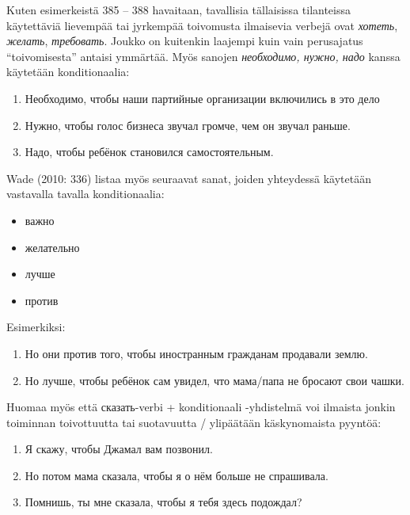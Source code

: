 \documentclass[]{scrreprt}
\providecommand{\tightlist}{%
  \setlength{\itemsep}{0pt}\setlength{\parskip}{0pt}}
\begin{document}
Kuten esimerkeistä 385 -- 388 havaitaan, tavallisia tällaisissa
tilanteissa käytettäviä lievempää tai jyrkempää toivomusta ilmaisevia
verbejä ovat \emph{хотеть}, \emph{желать}, \emph{требовать}. Joukko on
kuitenkin laajempi kuin vain perusajatus ``toivomisesta'' antaisi
ymmärtää. Myös sanojen \emph{необходимо, нужно, надо} kanssa käytetään
konditionaalia:

\begin{enumerate}
\def\labelenumi{(\arabic{enumi})}
\setcounter{enumi}{388}
\tightlist
\item
  Необходимо, чтобы наши партийные организации включились в это дело
\item
  Нужно, чтобы голос бизнеса звучал громче, чем он звучал раньше.
\item
  Надо, чтобы ребёнок становился самостоятельным.
\end{enumerate}

Wade (2010: 336) listaa myös seuraavat sanat, joiden yhteydessä
käytetään vastavalla tavalla konditionaalia:

\begin{itemize}
\tightlist
\item
  важно
\item
  желательно
\item
  лучше
\item
  против
\end{itemize}

Esimerkiksi:

\begin{enumerate}
\def\labelenumi{(\arabic{enumi})}
\setcounter{enumi}{391}
\tightlist
\item
  Но они против того, чтобы иностранным гражданам продавали землю.
\item
  Но лучше, чтобы ребёнок сам увидел, что мама/папа не бросают свои
  чашки.
\end{enumerate}

Huomaa myös että сказать-verbi + konditionaali -yhdistelmä voi ilmaista
jonkin toiminnan toivottuutta tai suotavuutta / ylipäätään käskynomaista
pyyntöä:

\begin{enumerate}
\def\labelenumi{(\arabic{enumi})}
\setcounter{enumi}{393}
\tightlist
\item
  Я скажу, чтобы Джамал вам позвонил.
\item
  Но потом мама сказала, чтобы я о нём больше не спрашивала.
\item
  Помнишь, ты мне сказала, чтобы я тебя здесь подождал?
\end{enumerate}
\end{document}
